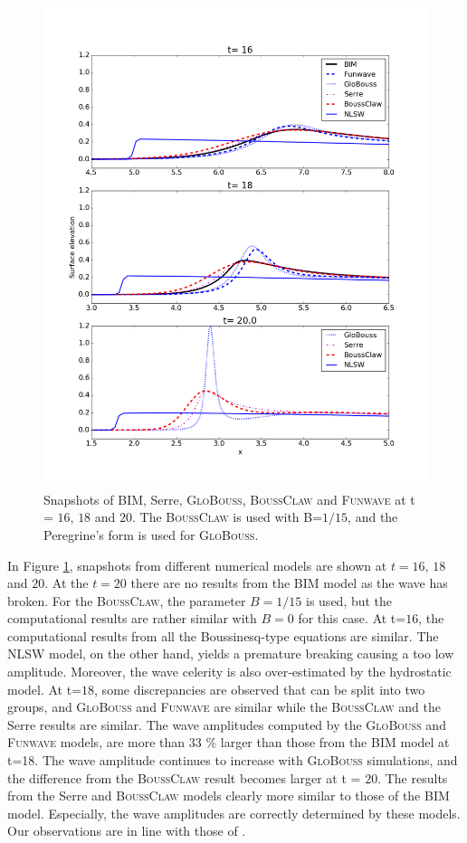 \documentclass[review]{elsarticle}
\newcommand{\BoussClaw}{\textsc{BoussClaw} }
\newcommand{\BoussClawt}{\textsc{BoussClaw}}
\begin{document}
\begin{figure}[tbh!]
\centering
\includegraphics[width=.9\textwidth]{_fig/bim_boussclaw_fun_glob.png}
\caption{Snapshots of BIM, Serre, \textsc{GloBouss}, \BoussClaw
and \textsc{Funwave} at t = $16$, $18$ and $20$.
The \BoussClaw is used with B=$1/15$,
and the Peregrine's form is used for \textsc{GloBouss}.}
\label{fig:bim_boussclaw_fun}
\end{figure}

In Figure \ref{fig:bim_boussclaw_fun}, snapshots from different
numerical models are shown at $t=16$, $18$ and $20$.
At the $t=20$ there are no results from the BIM model as  the wave has broken.
For the \BoussClawt, the parameter $B=1/15$ is used, 
but the computational results are rather similar with $B=0$
for this case. 
At t=$16$, the computational results
from all the Boussinesq-type equations are similar.
The NLSW model, on the other hand, yields a premature breaking 
causing a too low amplitude. Moreover, the wave celerity is also over-estimated
by the hydrostatic model. 
At t=$18$, some discrepancies are observed 
that can be split into two groups, and
\textsc{GloBouss} and \textsc{Funwave} 
are similar while the \BoussClaw
and the Serre results are similar. 
The wave amplitudes computed by the \textsc{GloBouss} and \textsc{Funwave} models,
are more than 33 \% 
larger than those from the BIM model at t=18.
The wave amplitude continues to increase 
with \textsc{GloBouss} simulations,
and the difference from the \BoussClaw result 
becomes larger at t = $20$. 
The results from the Serre and \BoussClaw models clearly
more similar to those of the BIM model. 
Especially, the wave amplitudes are correctly determined by these models.
Our observations are in line with those of \citet{wei1995fully}.
 
\end{document}
